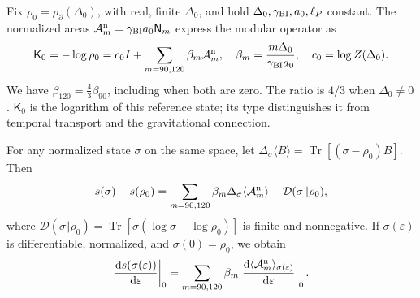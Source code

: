 Fix \(\rho_0=\rho_\partial(\Delta_0)\), with
real, finite \(\Delta_0\), and hold
\(\Delta_0,\gamma_{\rm BI},a_0,\ell_P\) constant. The normalized
areas \(\mathcal A_m^{\rm n}=\gamma_{\rm BI}a_0\mathsf N_m\)
express the modular operator as
\begin{equation}
 \mathsf K_0=-\log\rho_0
 =c_0I+\sum_{m=90,120}\beta_m\mathcal A_m^{\rm n},
 \quad \beta_m=\frac{m\Delta_0}{\gamma_{\rm BI}a_0},
 \quad c_0=\log Z(\Delta_0).
 \label{vii:eq:operador-modular-areal}
\end{equation}
We have \(\beta_{120}=\tfrac43\beta_{90}\), including when both
are zero. The ratio is \(4/3\) when \(\Delta_0\ne0\).
\(\mathsf K_0\) is the logarithm of this reference state; its type
distinguishes it from temporal transport and the gravitational connection.

\begin{theorem}
\label{vii:thm:ley-modular-finita}
For any normalized state \(\sigma\) on the same space, let
\(\Delta_\sigma\langle B\rangle
=\operatorname{Tr}[(\sigma-\rho_0)B]\). Then
\begin{equation}
 s(\sigma)-s(\rho_0)
 =\sum_{m=90,120}\beta_m\Delta_\sigma\langle\mathcal A_m^{\rm n}\rangle
  -\mathcal D(\sigma\Vert\rho_0),
 \label{vii:eq:ley-modular-finita}
\end{equation}
where
\(\mathcal D(\sigma\Vert\rho_0)
=\operatorname{Tr}[\sigma(\log\sigma-\log\rho_0)]\)
is finite and nonnegative. If \(\sigma(\varepsilon)\) is differentiable,
normalized, and \(\sigma(0)=\rho_0\), we obtain
\begin{equation}
 \left.\frac{\mathrm ds(\sigma(\varepsilon))}{\mathrm d\varepsilon}\right|_0
 =\sum_{m=90,120}\beta_m
   \left.\frac{\mathrm d\langle\mathcal A_m^{\rm n}\rangle_{
                 \sigma(\varepsilon)}}{\mathrm d\varepsilon}\right|_0.
 \label{vii:eq:primera-ley-modular}
\end{equation}
\end{theorem}

